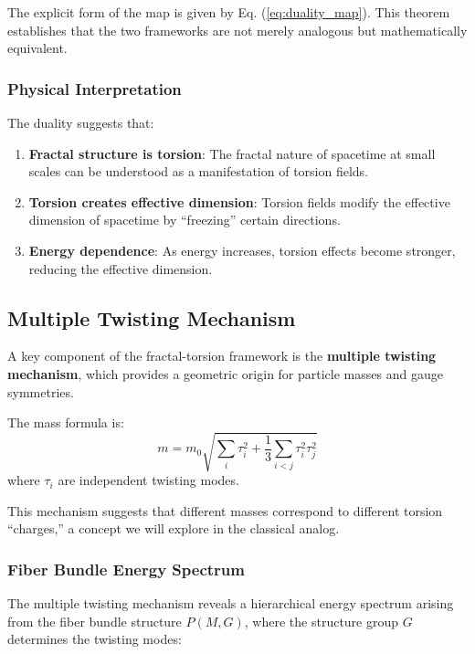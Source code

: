 \documentclass[12pt,a4paper]{article}
\begin{document}
The explicit form of the map is given by Eq. (\ref{eq:duality_map}). This theorem establishes that the two frameworks are not merely analogous but mathematically equivalent.

\subsubsection{Physical Interpretation}

The duality suggests that:
\begin{enumerate}
    \item \textbf{Fractal structure is torsion}: The fractal nature of spacetime at small scales can be understood as a manifestation of torsion fields.
    \item \textbf{Torsion creates effective dimension}: Torsion fields modify the effective dimension of spacetime by ``freezing'' certain directions.
    \item \textbf{Energy dependence}: As energy increases, torsion effects become stronger, reducing the effective dimension.
\end{enumerate}

\subsection{Multiple Twisting Mechanism}

A key component of the fractal-torsion framework is the \textbf{multiple twisting mechanism}, which provides a geometric origin for particle masses and gauge symmetries.

The mass formula is:
\begin{equation}
    m = m_0 \sqrt{\sum_i \tau_i^2 + \frac{1}{3}\sum_{i<j} \tau_i^2 \tau_j^2}
\end{equation}
where $\tau_i$ are independent twisting modes.

This mechanism suggests that different masses correspond to different torsion ``charges,'' a concept we will explore in the classical analog.

\subsubsection{Fiber Bundle Energy Spectrum}

The multiple twisting mechanism reveals a hierarchical energy spectrum arising from the fiber bundle structure $P(M, G)$, where the structure group $G$ determines the twisting modes:
\end{document}
